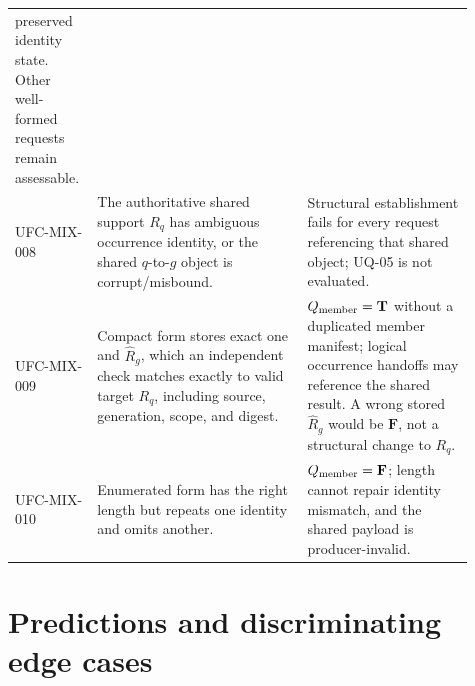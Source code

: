 \begin{longtable}{p{0.14\linewidth}p{0.43\linewidth}p{0.34\linewidth}}
preserved identity state. Other well-formed requests remain assessable.\\
UFC-MIX-008 & The authoritative shared support \(R_q\) has ambiguous
occurrence identity, or the shared \(q\)-to-\(g\) object is corrupt/misbound. &
Structural establishment fails for every request referencing that shared
object; UQ-05 is not evaluated.\\
UFC-MIX-009 & Compact form stores exact one and \(\widehat R_g\), which an
independent check matches exactly to valid target \(R_q\), including source,
generation, scope, and digest. & \(Q_{\rm member}=\mathbf T\) without a
duplicated member manifest; logical occurrence handoffs may reference the
shared result. A wrong stored \(\widehat R_g\) would be \(\mathbf F\), not a
structural change to \(R_q\).\\
UFC-MIX-010 & Enumerated form has the right length but repeats one identity and
omits another. & \(Q_{\rm member}=\mathbf F\); length cannot repair identity
mismatch, and the shared payload is producer-invalid.\\
\bottomrule
\end{longtable}

\section{Predictions and discriminating edge cases}

